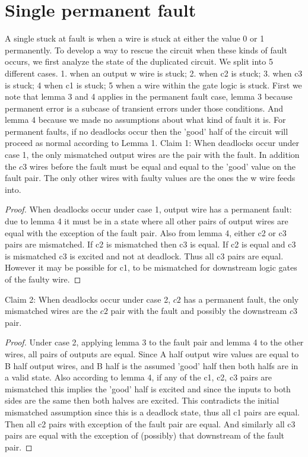 \documentclass{article}
\begin{document}
\section{Single permanent fault}
A single stuck at fault is when a wire is stuck at either the value 0 or 1 permanently.  To develop a way to rescue the circuit when these kinds of fault occurs, we first analyze the state of the duplicated circuit.  We split into 5 different cases.  1. when an output w wire is stuck; 2. when c2 is stuck; 3. when c3 is stuck; 4 when c1 is stuck; 5 when a wire within the gate logic is stuck.  First we note that lemma 3 and 4 applies in the permanent fault case, lemma 3 because permanent error is a subcase of transient errors under those conditions.  And lemma 4 because we made no assumptions about what kind of fault it is.  For permanent faults, if no deadlocks occur then the 'good' half of the circuit will proceed as normal according to Lemma 1.  \newline
Claim 1: When deadlocks occur under case 1, the only mismatched output wires are the pair with the fault.  In addition the $c3$ wires before the fault must be equal and equal to the 'good' value on the fault pair.  The only other wires with faulty values are the ones the w wire feeds into.
\begin{proof}
When deadlocks occur under case 1, output wire has a permanent fault: due to lemma 4 it must be in a state where all other pairs of output wires are equal with the exception of the fault pair.  Also from lemma 4, either c2 or c3 pairs are mismatched.  If c2 is mismatched then c3 is equal. If c2 is equal and c3 is mismatched c3 is excited and not at deadlock.  Thus all c3 pairs are equal.   However it may be possible for c1, to be mismatched for downstream logic gates of the faulty wire.
\end{proof}
Claim 2: When deadlocks occur under case 2, $c2$ has a permanent fault, the only mismatched wires are the $c2$ pair with the fault and possibly the downstream $c3$ pair.
\begin{proof}
Under case 2, applying lemma 3 to the fault pair and lemma 4 to the other wires, all pairs of outputs are equal.  Since A half output wire values are equal to B half output wires, and B half is the assumed 'good' half then both halfs are in a valid state.  Also according to lemma 4, if any of the c1, c2, c3 pairs are mismatched this implies the 'good' half is excited and since the inputs to both sides are the same then both halves are excited.  This contradicts the initial mismatched assumption since this is a deadlock state, thus all c1 pairs are equal.  Then all c2 pairs with exception of the fault pair are equal.  And similarly all c3 pairs are equal with the exception of (possibly) that downstream of the fault pair. \newline
\end{proof}
\end{document}
